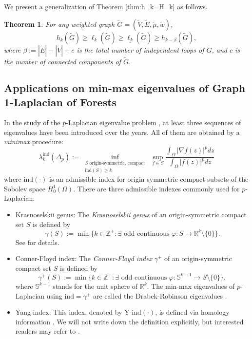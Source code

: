 \documentclass[12pt, reqno]{article}
\newtheorem{theorem}{Theorem}
\begin{document}
We present a generalization of {Theorem \ref{thm:h_k=H_k}} as follows.
\begin{theorem}\label{thm:cycle-number-inequ}
For any weighted graph $\tilde G=(\tilde V,\tilde E,\tilde\mu,\tilde w)$,  \[h_k(\tilde G)\ge \ell_k(\tilde G)\ge \underline{\ell_k}(\tilde G)\ge h_{k-\beta}(\tilde G),\] where $\beta:=|\tilde E|-|\tilde V|+c$ is the total number of independent loops of $\tilde G$, and $c$ is the number of connected components of $\tilde G$. 
\end{theorem}

\subsection{Applications on min-max eigenvalues of Graph 1-Laplacian of Forests}\label{sec:minmax-eigen-1-Lap}
In the study of the $p$-Laplacian eigenvalue problem \cite{BH25,Burger,Drutu,Fazeny,HN25,Keller,LMR}, at least three sequences of eigenvalues have been introduced over the years. All of them are obtained by a \emph{minimax} procedure:
\begin{equation}\label{eq:continuous}
\lambda_k^{\mathrm{ind}}(\Delta_p):=\inf_{\substack{S\text{ origin-symmetric, compact}\\\mathrm{ind}(S)\ge k}}~\sup_{f\in S}\frac{\int_\Omega|\nabla f(z)|^pdz}{\int_\Omega|f(z)|^pdz}
\end{equation}
where $\mathrm{ind}(\cdot)$ is an admissible index for origin-symmetric compact subsets of the Sobolev space $H_0^1(\Omega)$. There are three admissible indexes commonly used for $p$-Laplacian:
\begin{itemize}
\item Krasnoselskii genus: The \emph{Krasnoselskii genus} of an origin-symmetric compact set $S$ is defined by $$\gamma(S):=\min\{k\in\mathbb{Z}^+:\exists\text{ odd continuous }\varphi:S\to \mathbb{R}^k\setminus\{0\}\}.$$ 
See \cite{Coffman} for details.
\item  Conner-Floyd index: The \emph{Conner-Floyd index} $\gamma^+$ of an origin-symmetric compact set $S$ is defined by $$\gamma^+(S):=\min\{k\in\mathbb{Z}^+:\exists\text{ odd continuous }\varphi:\mathbb{S}^{k-1}\to S\setminus\{0\}\},$$ 
where $\mathbb{S}^{k-1}$ stands for the unit sphere of $\mathbb{R}^k$. 
The min-max eigenvalues of $p$-Laplacian using $\mathrm{ind}=\gamma^+$ are called the Drabek-Robinson eigenvalues \cite{Drabek}.
\item Yang index: This index, denoted by $\textrm{Y-ind}(\cdot)$, is defined via homology information \cite{Yang}. We will not write down the definition explicitly, but interested readers may refer to \cite{Perera}.
\end{itemize}
\end{document}
